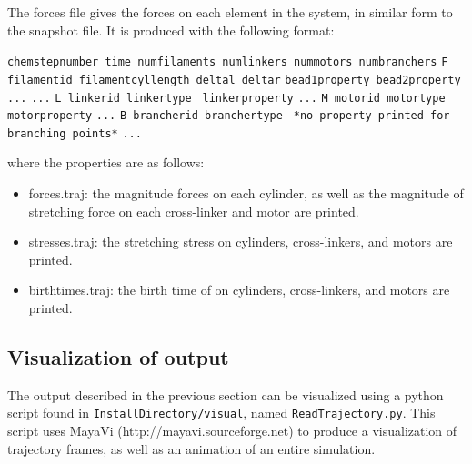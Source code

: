 \documentclass[11pt, oneside]{article}   	%
\begin{document}
The forces file gives the forces on each element in the system, in similar form to the snapshot file. It is produced with the following format:\newline

\noindent\texttt{chemstepnumber time numfilaments numlinkers nummotors numbranchers}\newline
\texttt{F filamentid filamentcyllength deltal deltar}\newline
\texttt{bead1property bead2property ...}\newline
\texttt{...}\newline
\texttt{L linkerid linkertype }\newline
\texttt{linkerproperty}\newline
\texttt{...}\newline
\texttt{M motorid motortype }\newline
\texttt{motorproperty}\newline
\texttt{...}\newline
\texttt{B brancherid branchertype }\newline
\texttt{*no property printed for branching points*}\newline
\texttt{...}\newline

\noindent where the properties are as follows:
\begin{itemize}
\item forces.traj: the magnitude forces on each cylinder, as well as the magnitude of stretching force on each cross-linker and motor are printed.
\item stresses.traj: the stretching stress on cylinders, cross-linkers, and motors are printed.
\item birthtimes.traj: the birth time of on cylinders, cross-linkers, and motors are printed.

\end{itemize}

\subsection{Visualization of output}

The output described in the previous section can be visualized using a python script found in \texttt{InstallDirectory/visual}, named \texttt{ReadTrajectory.py}. This script uses MayaVi (http://mayavi.sourceforge.net) to produce a visualization of trajectory frames, as well as an animation of an entire simulation.
\end{document}
